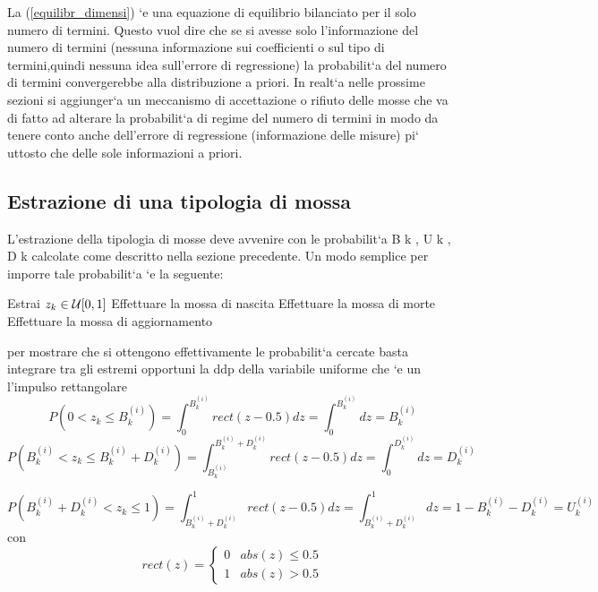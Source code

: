 La (\ref{equilibr_dimensi}) `e una equazione di equilibrio bilanciato per il solo numero di termini.
Questo vuol dire che se si avesse solo l’informazione del numero di termini (nessuna
informazione sui coefficienti o sul tipo di termini,quindi nessuna idea sull’errore di
regressione) la probabilit`a del numero di termini convergerebbe alla distribuzione a
priori. In realt`a nelle prossime sezioni si aggiunger`a un meccanismo di accettazione
o rifiuto delle mosse che va di fatto ad alterare la probabilit`a di regime del numero
di termini in modo da tenere conto anche dell’errore di regressione (informazione
delle misure) pi`
uttosto che delle sole informazioni a priori.
\subsection{Estrazione di una tipologia di mossa}
L’estrazione della tipologia di mosse deve avvenire con le probabilit`a B k , U k , D k
calcolate come descritto nella sezione precedente. Un modo semplice per imporre
tale probabilit`a `e la seguente:\\

\begin{algorithmic}
\State Estrai $z_k\in\mathcal{U}[0,1]$
\State Effettuare la mossa di nascita
\State Effettuare la mossa di morte
\Else
\State Effettuare la mossa di aggiornamento
\EndIf
\end{algorithmic}
per mostrare che si ottengono effettivamente le probabilit`a cercate basta integrare
tra gli estremi opportuni la ddp della variabile uniforme che `e un l’impulso
rettangolare
\begin{equation}
P\left(0<z_k\leq B_k^{(i)}\right)=\int_0^{B_k^{(i)}}rect(z-0.5)dz=\int_0^{B_k^{(i)}}dz={B_k^{(i)}}
\end{equation}
\begin{equation}
P\left(B_k^{(i)}<z_k\leq B_k^{(i)}+D_k^{(i)}\right)=\int_{B_k^{(i)}}^{B_k^{(i)}+D_k^{(i)}}rect(z-0.5)dz=\int_0^{D_k^{(i)}}dz={D_k^{(i)}}
\end{equation}

\begin{equation}
P\left(B_k^{(i)}+D_k^{(i)}<z_k\leq 1 \right)=\int_{B_k^{(i)}+D_k^{(i)}}^{1}rect(z-0.5)dz=\int_{B_k^{(i)}+D_k^{(i)}}^{1}dz=1-{B_k^{(i)}}-{D_k^{(i)}}=U_k^{(i)}
\end{equation}
con
\begin{equation}
rect(z)=\begin{cases}
0 & abs(z)\leq 0.5\\
1 & abs(z)>0.5 
\end{cases}
\end{equation}

